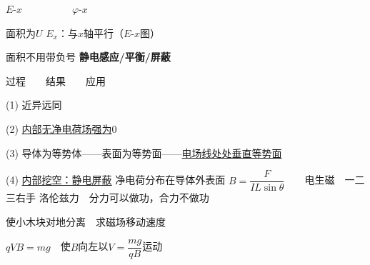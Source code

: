 \noindent $E$-$x$　　　　　$\varphi$-$x$

\noindent 面积为$U$
\noindent $E_x$：与$x$轴平行（$E$-$x$图）%

\noindent 面积不用带负号
\textbf{静电感应/平衡/屏蔽}

\noindent 过程　　结果　　应用
\noindent {}

\noindent (1) 近异远同

\noindent (2) \underline{内部无净电荷场强为$0$}

\noindent (3) 导体为等势体——表面为等势面——\underline{电场线处处垂直等势面}

\noindent (4) \underline{内部挖空：静电屏蔽}
净电荷分布在导体外表面
\noindent $B=\dfrac{F}{IL\sin\theta}$　　电生磁　一二三右手%
\noindent 洛伦兹力　分力可以做功，合力不做功

\begin{problem}
使小木块对地分离　求磁场移动速度
\begin{solution}
$qVB=mg$　使$B$向左以$V=\dfrac{mg}{qB}$运动
\end{solution}
\end{problem}
